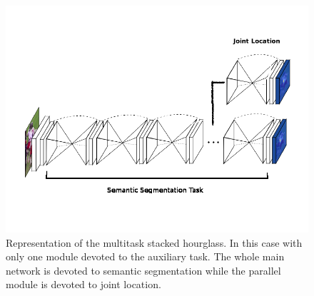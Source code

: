 \documentclass[12pt,a4paper]{article}
\begin{document}
\begin{figure}
\centering
\includegraphics[scale=0.4]{multitask.png}
\caption{Representation of the multitask stacked hourglass. In this case with only one module devoted to the auxiliary task. The whole main network is devoted to semantic segmentation while the parallel module is devoted to joint location.}
\label{hourglass:multitask}
\end{figure}
\end{document}
